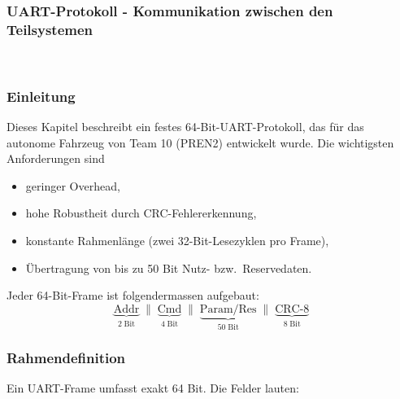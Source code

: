 \documentclass[main.tex]{subfiles} %
\begin{document}
\subsubsection{UART-Protokoll - Kommunikation zwischen den Teilsystemen}~\label{sec:prain_uart}

\subsubsection*{Einleitung}
Dieses Kapitel beschreibt ein festes 64-Bit-UART-Protokoll, das für
das autonome Fahrzeug von Team 10 (PREN2) entwickelt wurde. Die
wichtigsten Anforderungen sind
\begin{itemize}
  \item geringer Overhead,
  \item hohe Robustheit durch CRC-Fehlererkennung,
  \item konstante Rahmenlänge (zwei 32-Bit-Lesezyklen pro Frame),
  \item Übertragung von bis zu 50 Bit Nutz- bzw.\ Reservedaten.
\end{itemize}

\bigskip
Jeder 64-Bit-Frame ist folgendermassen aufgebaut:
\[
  \underbrace{\text{Addr}}_{2\;\text{Bit}}
  \;\|\;
  \underbrace{\text{Cmd}}_{4\;\text{Bit}}
  \;\|\;
  \underbrace{\text{Param/Res}}_{50\;\text{Bit}}
  \;\|\;
  \underbrace{\text{CRC-8}}_{8\;\text{Bit}}
\]

\subsubsection*{Rahmendefinition}
Ein UART-Frame umfasst exakt 64 Bit. Die Felder lauten:
\end{document}
